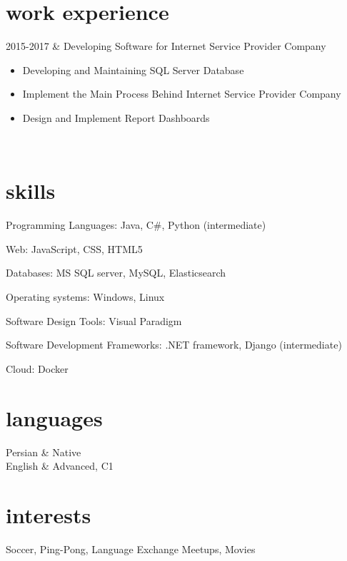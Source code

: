\documentclass[
    changecolor={111, 156, 45}, 
]{cv-roald}
\begin{document}
\section*{work experience}
\begin{tabularcv}
2015-2017   &   
                \newline Developing Software for Internet Service Provider Company
                \begin{itemize}
                  \item Developing and Maintaining SQL Server Database
                  \item Implement the Main Process Behind Internet Service Provider Company
                  \item Design and Implement Report Dashboards
                \end{itemize} 
              	\\
\end{tabularcv}   

\iffalse
\section*{awards}
\begin{tabularcv}	
2010        &   Winner of \emph{Turing} contest in Lancaster 
                ($\pm$ 431 contenders). \link{http://someurl.com/}
\end{tabularcv}
\fi
\section*{skills}

Programming Languages: Java, C\#, Python (intermediate)

Web: JavaScript, CSS, HTML5

Databases: MS SQL server, MySQL, Elasticsearch

Operating systems: Windows, Linux

Software Design Tools: Visual Paradigm

Software Development Frameworks: .NET framework, Django (intermediate)

Cloud: Docker

\section*{languages}
\begin{tabularcv}
Persian     &	Native \\
English     &  	Advanced, C1 \\
\end{tabularcv}

\section*{interests}
Soccer, Ping-Pong, Language Exchange Meetups, Movies
    
\end{document}
